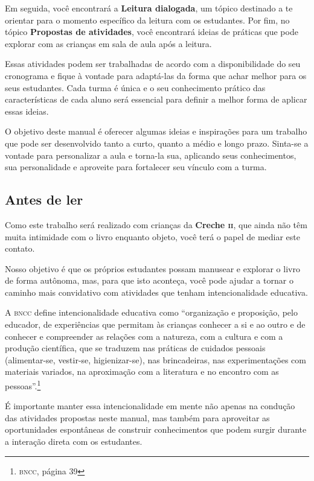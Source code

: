 \documentclass[11pt]{extarticle}
\begin{document}
Em seguida, você encontrará a \textbf{Leitura dialogada}, um 
tópico destinado a te orientar para o momento específico da 
leitura com os estudantes. Por fim, no tópico 
\textbf{Propostas de atividades}, você encontrará ideias 
de práticas que pode explorar com as crianças em sala de 
aula após a leitura. 

Essas atividades podem ser trabalhadas de acordo com a 
disponibilidade do seu cronograma e fique à vontade para adaptá-las 
da forma que achar melhor para os seus estudantes. Cada turma é única 
e o seu conhecimento prático das características de cada aluno será 
essencial para definir a melhor forma de aplicar essas ideias. 

O objetivo deste manual é oferecer algumas ideias 
e inspirações para um trabalho que pode ser desenvolvido tanto 
a curto, quanto a médio e longo prazo. Sinta-se a vontade para 
personalizar a aula e torna-la sua, aplicando seus conhecimentos, sua 
personalidade e aproveite para fortalecer 
seu vínculo com a turma.


\subsection{Antes de ler}


Como este trabalho será realizado com crianças da \textbf{Creche \textsc{ii}}, 
que ainda não têm muita intimidade com o livro enquanto objeto, você terá o 
papel de mediar este contato. 

Nosso objetivo é que os próprios estudantes possam manusear 
e explorar o livro de forma autônoma, mas, para que isto aconteça, você 
pode ajudar a tornar o caminho mais convidativo com atividades que tenham 
intencionalidade educativa. 

A \textsc{bncc} define intencionalidade educativa como ``organização 
e proposição, pelo educador, de experiências que permitam às crianças 
conhecer a si e ao outro e de conhecer e compreender as relações com a 
natureza, com a cultura e com a produção científica, que se traduzem nas 
práticas de cuidados pessoais (alimentar-se, vestir-se, higienizar-se), 
nas brincadeiras, nas experimentações com materiais 
variados, na aproximação com a literatura e no encontro com as 
pessoas''.\footnote{\textsc{bncc}, página 39}

É importante manter essa intencionalidade em mente não apenas na condução 
das atividades propostas neste manual, mas também para aproveitar as 
oportunidades espontâneas de construir conhecimentos que podem surgir durante 
a interação direta com os estudantes.
\end{document}

